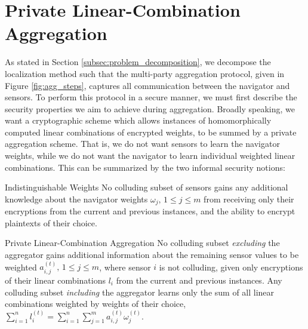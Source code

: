 \documentclass[10pt,letterpaper,oneside,twocolumn,journal]{IEEEtran}
\theoremstyle{definition}
\theoremstyle{definition}
\theoremstyle{remark}
\begin{document}
% 
%                                                                                     
%                                                                                     
%                                                                                     
% 

\section{Private Linear-Combination Aggregation} \label{sec:lcao_definition}
As stated in Section \ref{subsec:problem_decomposition}, we decompose the localization method such that the multi-party aggregation protocol, given in Figure \ref{fig:agg_steps}, captures all communication between the navigator and sensors. To perform this protocol in a secure manner, we must first describe the security properties we aim to achieve during aggregation. Broadly speaking, we want a cryptographic scheme which allows instances of homomorphically computed linear combinations of encrypted weights, to be summed by a private aggregation scheme. That is, we do not want sensors to learn the navigator weights, while we do not want the navigator to learn individual weighted linear combinations. This can be summarized by the two informal security notions:
\begin{LaTeXdescription}
    \item[Indistinguishable Weights] No colluding subset of sensors gains any additional knowledge about the navigator weights $\omega_j,\,1\leq j \leq m$ from receiving only their encryptions from the current and previous instances, and the ability to encrypt plaintexts of their choice.
    \item[Private Linear-Combination Aggregation] No colluding subset \textit{excluding} the aggregator gains additional information about the remaining sensor values to be weighted $a^{(t)}_{i,j},\,1\leq j\leq m$, where sensor $i$ is not colluding, given only encryptions of their linear combinations $l_i$ from the current and previous instances. Any colluding subset \textit{including} the aggregator learns only the sum of all linear combinations weighted by weights of their choice, $\sum^{n}_{i=1}l_i^{(t)}=\sum^{n}_{i=1}\sum^{m}_{j=1} a^{(t)}_{i,j}\omega^{(t)}_j$.
\end{LaTeXdescription}
\end{document}
